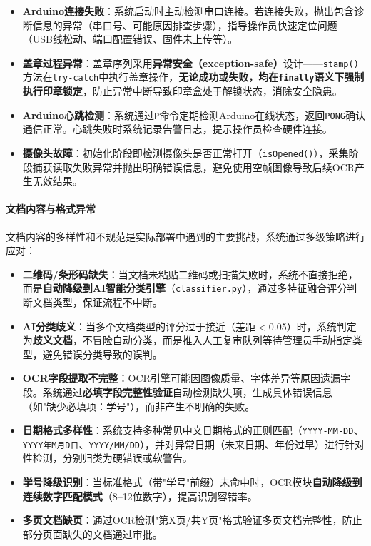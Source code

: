 \documentclass[conference]{IEEEtran}
\begin{document}
\begin{itemize}[leftmargin=*]
    \item \textbf{Arduino连接失败}：系统启动时主动检测串口连接。若连接失败，抛出包含诊断信息的异常（串口号、可能原因排查步骤），指导操作员快速定位问题（USB线松动、端口配置错误、固件未上传等）。
    \item \textbf{盖章过程异常}：盖章序列采用\textbf{异常安全（exception-safe）}设计——\texttt{stamp()}方法在\texttt{try-catch}中执行盖章操作，\textbf{无论成功或失败，均在\texttt{finally}语义下强制执行印章锁定}，防止异常中断导致印章盒处于解锁状态，消除安全隐患。
    \item \textbf{Arduino心跳检测}：系统通过\texttt{P}命令定期检测Arduino在线状态，返回\texttt{PONG}确认通信正常。心跳失败时系统记录告警日志，提示操作员检查硬件连接。
    \item \textbf{摄像头故障}：初始化阶段即检测摄像头是否正常打开（\texttt{isOpened()}），采集阶段捕获读取失败异常并抛出明确错误信息，避免使用空帧图像导致后续OCR产生无效结果。
\end{itemize}

\paragraph{文档内容与格式异常}

文档内容的多样性和不规范是实际部署中遇到的主要挑战，系统通过多级策略进行应对：

\begin{itemize}[leftmargin=*]
    \item \textbf{二维码/条形码缺失}：当文档未粘贴二维码或扫描失败时，系统不直接拒绝，而是\textbf{自动降级到AI智能分类引擎}（\texttt{classifier.py}），通过多特征融合评分判断文档类型，保证流程不中断。
    \item \textbf{AI分类歧义}：当多个文档类型的评分过于接近（差距$<$0.05）时，系统判定为\textbf{歧义文档}，不冒险自动分类，而是推入人工复审队列等待管理员手动指定类型，避免错误分类导致的误判。
    \item \textbf{OCR字段提取不完整}：OCR引擎可能因图像质量、字体差异等原因遗漏字段。系统通过\textbf{必填字段完整性验证}自动检测缺失项，生成具体错误信息（如"缺少必填项：学号"），而非产生不明确的失败。
    \item \textbf{日期格式多样性}：系统支持多种常见中文日期格式的正则匹配（\texttt{YYYY-MM-DD}、\texttt{YYYY年M月D日}、\texttt{YYYY/MM/DD}），并对异常日期（未来日期、年份过早）进行针对性检测，分别归类为硬错误或软警告。
    \item \textbf{学号降级识别}：当标准格式（带"学号"前缀）未命中时，OCR模块\textbf{自动降级到连续数字匹配模式}（8--12位数字），提高识别容错率。
    \item \textbf{多页文档缺页}：通过OCR检测"第X页/共Y页"格式验证多页文档完整性，防止部分页面缺失的文档通过审批。
\end{itemize}
\end{document}
